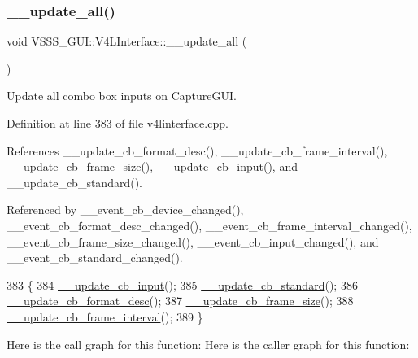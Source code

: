 \subsubsection{\texorpdfstring{\+\_\+\+\_\+update\+\_\+all()}{\_\_update\_all()}}
{\footnotesize\ttfamily void V\+S\+S\+S\+\_\+\+G\+U\+I\+::\+V4\+L\+Interface\+::\+\_\+\+\_\+update\+\_\+all (\begin{DoxyParamCaption}{ }\end{DoxyParamCaption})\hspace{0.3cm}{\ttfamily [private]}}



Update all combo box inputs on Capture\+G\+UI. 



Definition at line 383 of file v4linterface.\+cpp.



References \+\_\+\+\_\+update\+\_\+cb\+\_\+format\+\_\+desc(), \+\_\+\+\_\+update\+\_\+cb\+\_\+frame\+\_\+interval(), \+\_\+\+\_\+update\+\_\+cb\+\_\+frame\+\_\+size(), \+\_\+\+\_\+update\+\_\+cb\+\_\+input(), and \+\_\+\+\_\+update\+\_\+cb\+\_\+standard().



Referenced by \+\_\+\+\_\+event\+\_\+cb\+\_\+device\+\_\+changed(), \+\_\+\+\_\+event\+\_\+cb\+\_\+format\+\_\+desc\+\_\+changed(), \+\_\+\+\_\+event\+\_\+cb\+\_\+frame\+\_\+interval\+\_\+changed(), \+\_\+\+\_\+event\+\_\+cb\+\_\+frame\+\_\+size\+\_\+changed(), \+\_\+\+\_\+event\+\_\+cb\+\_\+input\+\_\+changed(), and \+\_\+\+\_\+event\+\_\+cb\+\_\+standard\+\_\+changed().


\begin{DoxyCode}
383                                     \{
384         \hyperlink{class_v_s_s_s___g_u_i_1_1_v4_l_interface_a33ec32eed4c06634040616c52b588e01}{\_\_update\_cb\_input}();
385         \hyperlink{class_v_s_s_s___g_u_i_1_1_v4_l_interface_a0decb6d5b23790bf902f9d202d727235}{\_\_update\_cb\_standard}();
386         \hyperlink{class_v_s_s_s___g_u_i_1_1_v4_l_interface_ad2da97031a8ca5d9e2d99f5a5459c267}{\_\_update\_cb\_format\_desc}();
387         \hyperlink{class_v_s_s_s___g_u_i_1_1_v4_l_interface_ab30bca15d7c9ffb5d3e7bc38ad2def25}{\_\_update\_cb\_frame\_size}();
388         \hyperlink{class_v_s_s_s___g_u_i_1_1_v4_l_interface_a0eeae871fc38dab3693860f6f391e062}{\_\_update\_cb\_frame\_interval}();
389     \}
\end{DoxyCode}
Here is the call graph for this function\+:
Here is the caller graph for this function\+:
\mbox{\label{class_v_s_s_s___g_u_i_1_1_v4_l_interface_a330fb43d7ec637c5e3a78ae4344a5865}} 
